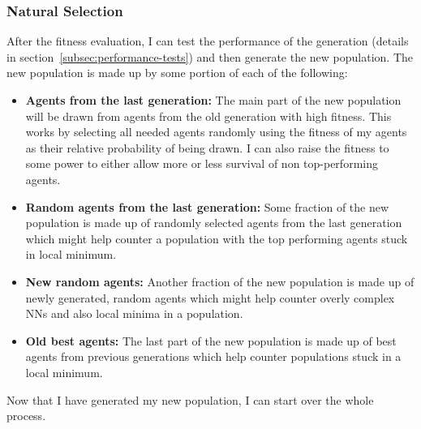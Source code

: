 \documentclass[11pt]{report}
\begin{document}
\begin{enumerate}
    \subsubsection{Natural Selection}
    After the fitness evaluation, I can test the performance of the generation (details in section~\ref{subsec:performance-tests}) and then generate the new population.
    The new population is made up by some portion of each of the following:
    \begin{itemize}
        \item \textbf{Agents from the last generation:}
        The main part of the new population will be drawn from agents from the old generation with high fitness.
        This works by selecting all needed agents randomly using the fitness of my agents as their relative probability of being drawn.
        I can also raise the fitness to some power to either allow more or less survival of non top-performing agents.
        \item \textbf{Random agents from the last generation:}
        Some fraction of the new population is made up of randomly selected agents from the last generation which might help counter a population with the top performing agents stuck in local minimum.
        \item \textbf{New random agents:}
        Another fraction of the new population is made up of newly generated, random agents which might help counter overly complex NNs and also local minima in a population.
        \item \textbf{Old best agents:}
        The last part of the new population is made up of best agents from previous generations which help counter populations stuck in a local minimum.
    \end{itemize}
    Now that I have generated my new population, I can start over the whole process.


\end{enumerate}
\end{document}
